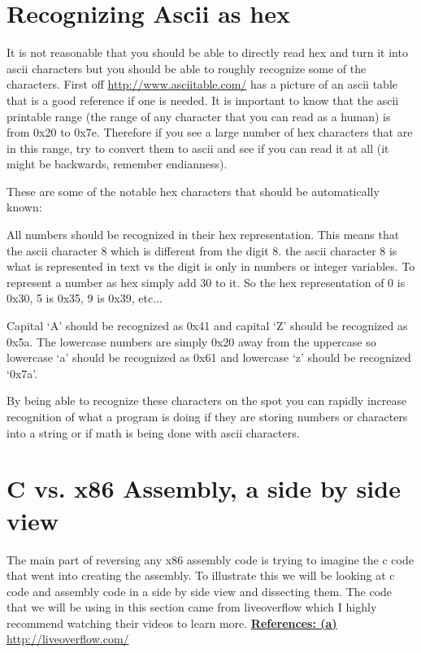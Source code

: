 \documentclass{report}
\begin{document}
\section{Recognizing Ascii as hex}
It is not reasonable that you should be able to directly read hex and turn it into ascii characters but you should be able to roughly recognize some of the characters.
First off \url{http://www.asciitable.com/} has a picture of an ascii table that is a good reference if one is needed.  
It is important to know that the ascii printable range (the range of any character that you can read as a human) is from 0x20 to 0x7e.  Therefore if you see a large number of hex characters that are in this range, try to convert them to ascii and see if you can read it at all (it might be backwards, remember endianness).

These are some of the notable hex characters that should be automatically known:

All numbers should be recognized in their hex representation.  This means that the ascii character 8 which is different from the digit 8.  the ascii character 8 is what is represented in text vs the digit is only in numbers or integer variables.  To represent a number as hex simply add 30 to it.  So the hex representation of 0 is 0x30, 5 is 0x35, 9 is 0x39, etc...

Capital `A' should be recognized as 0x41 and capital `Z' should be recognized as 0x5a.  The lowercase numbers are simply 0x20 away from the uppercase so lowercase `a' should be recognized as 0x61 and lowercase `z' should be recognized `0x7a'.  

By being able to recognize these characters on the spot you can rapidly increase recognition of what a program is doing if they are storing numbers or characters into a string or if math is being done with ascii characters.

\section{C vs. x86 Assembly, a side by side view}
The main part of reversing any x86 assembly code is trying to imagine the c code that went into creating the assembly.  To illustrate this we will be looking at c code and assembly code in a side by side view and dissecting them.  The code that we will be using in this section came from liveoverflow which I highly recommend watching their videos to learn more. \hyperref[ref:2]{\textbf{References: (a)}}
\url{http://liveoverflow.com/}
\end{document}
